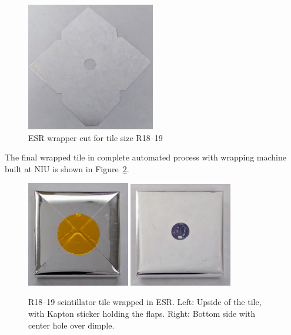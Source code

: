 \begin{figure}[!ht]
  \centering
  \includegraphics[width=0.5\textwidth]{figures/hgcal/esr_wrapper.jpg}
  \caption[ESR wrapper cut for tile size R18--19]
  {ESR wrapper cut for tile size R18--19}%
  \label{fig:hgcal-esr-wrapper}
\end{figure}

The final wrapped tile in complete automated process
with wrapping machine built at NIU
is shown in Figure~\ref{fig:hgcal-scintillator-tile-wrapped}.

\begin{figure}[!ht]
  \centering
  \includegraphics[width=0.4\textwidth]{figures/hgcal/wrapped_tile_up.jpg}
  \includegraphics[width=0.4\textwidth]{figures/hgcal/wrapped_tile_down.jpg}
  \caption[R18--19 scintillator tile wrapped in ESR]
  {R18--19 scintillator tile wrapped in ESR\@. Left: Upside of the tile, with
    Kapton sticker holding the flaps. Right: Bottom side with center hole
    over dimple.}%
  \label{fig:hgcal-scintillator-tile-wrapped}
\end{figure}

